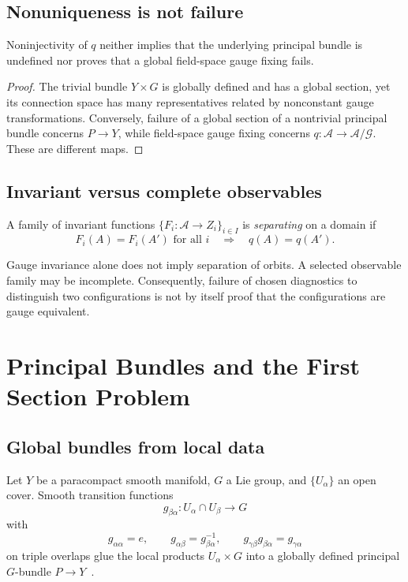 \documentclass[11pt]{article}
\newcommand{\Conn}{\mathcal A}
\newcommand{\Gg}{\mathcal G}
\begin{document}
\subsection{Nonuniqueness is not failure}

\begin{proposition}
\label{prop:redundancy}
Noninjectivity of $q$ neither implies that the underlying principal bundle is
undefined nor proves that a global field-space gauge fixing fails.
\end{proposition}

\begin{proof}
The trivial bundle $Y\times G$ is globally defined and has a global section,
yet its connection space has many representatives related by nonconstant gauge
transformations.  Conversely, failure of a global section of a nontrivial
principal bundle concerns $P\to Y$, while field-space gauge fixing concerns
$q:\Conn\to\Conn/\Gg$.  These are different maps.
\end{proof}

\subsection{Invariant versus complete observables}

\begin{definition}
A family of invariant functions $\{F_i:\Conn\to Z_i\}_{i\in I}$ is
\emph{separating} on a domain if
\[
 F_i(A)=F_i(A')\text{ for all }i
 \quad\Longrightarrow\quad
 q(A)=q(A').
\]
\end{definition}

Gauge invariance alone does not imply separation of orbits.  A selected
observable family may be incomplete.  Consequently, failure of chosen
diagnostics to distinguish two configurations is not by itself proof that the
configurations are gauge equivalent.

\section{Principal Bundles and the First Section Problem}

\subsection{Global bundles from local data}

Let $Y$ be a paracompact smooth manifold, $G$ a Lie group, and
$\{U_\alpha\}$ an open cover.  Smooth transition functions
\[
 g_{\beta\alpha}:U_\alpha\cap U_\beta\longrightarrow G
\]
with
\[
 g_{\alpha\alpha}=e,\qquad
 g_{\alpha\beta}=g_{\beta\alpha}^{-1},\qquad
 g_{\gamma\beta}g_{\beta\alpha}=g_{\gamma\alpha}
\]
on triple overlaps glue the local products $U_\alpha\times G$ into a
globally defined principal $G$-bundle $P\to Y$~\cite{KobayashiNomizu,Steenrod}.
\end{document}
